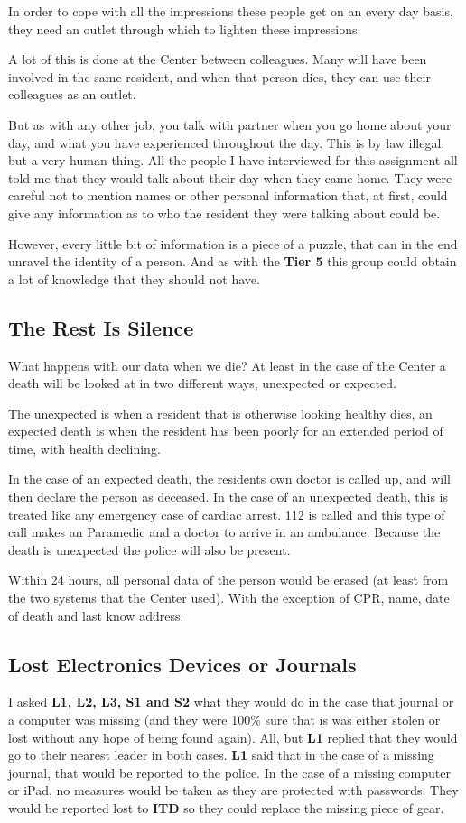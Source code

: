 \documentclass[11pt]{article}
\begin{document}
In order to cope with all the impressions these people get on an every day basis, they need an outlet through which to lighten these impressions.

A lot of this is done at the Center between colleagues. Many will have been involved in the same resident, and when that person dies, they can use their colleagues as an outlet.

But as with any other job, you talk with partner when you go home about your day, and what you have experienced throughout the day.
This is by law illegal, but a very human thing. All the people I have interviewed for this assignment all told me that they would talk about their day when they came home. They were careful not to mention names or other personal information that, at first, could give any information as to who the resident they were talking about could be.

However, every little bit of information is a piece of a puzzle, that can in the end unravel the identity of a person. And as with the \textbf{Tier 5} this group could obtain a lot of knowledge that they should not have.

\subsection{The Rest Is Silence}
What happens with our data when we die? At least in the case of the Center a death will be looked at in two different ways, unexpected or expected. 

The unexpected is when a resident that is otherwise looking healthy dies, an expected death is when the resident has been poorly for an extended period of time, with health declining.

In the case of an expected death, the residents own doctor is called up, and will then declare the person as deceased. In the case of an unexpected death, this is treated like any emergency case of cardiac arrest. 112 is called and this type of call makes an Paramedic and a doctor to arrive in an ambulance. Because the death is unexpected the police will also be present.

Within 24 hours, all personal data of the person would be erased (at least from the two systems that the Center used). With the exception of CPR, name, date of death and last know address. 


\subsection{Lost Electronics Devices or Journals}
I asked \textbf{L1, L2, L3, S1 and S2} what they would do in the case that journal or a computer was missing (and they were 100\% sure that is was either stolen or lost without any hope of being found again). All, but \textbf{L1} replied that they would go to their nearest leader in both cases. \textbf{L1} said that in the case of a missing journal, that would be reported to the police. In the case of a missing computer or iPad, no measures would be taken as they are protected with passwords. They would be reported lost to \textbf{ITD} so they could replace the missing piece of gear.
\end{document}
